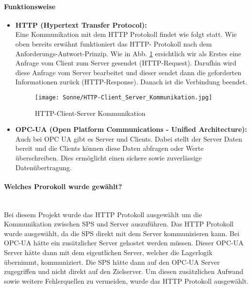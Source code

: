     \paragraph{Funktionsweise}

            \begin{itemize}
                \item \textbf{{HTTP (Hypertext Transfer Protocol):}} \mbox{} \\
                Eine Kommunikation mit dem HTTP Protokoll findet wie folgt statt. Wie oben bereits erwähnt funktioniert das HTTP- Protokoll nach dem Anforderungs-Antwort-Prinzip. Wie in Abb. \ref{HTTP-Client_Server_Kommunikation} ersichtlich wir als Erstes eine Anfrage vom Client zum Server gesendet (HTTP-Request). Darufhin wird diese Anfrage vom Server bearbeitet und dieser sendet dann die geforderten Informationen zurück (HTTP-Response). Danach ist die Verbindung beendet.
                \cite{HTTP-Client_Server_Kommunikation}

                \begin{figure}[h]
                    \centering
                    \texttt{[image: Sonne/HTTP-Client\_Server\_Kommunikation.jpg]}
                    \caption{HTTP-Client-Server Kommunikation 
                    \cite{HTTP-Client_Server_Kommunikation}}
                    \label{HTTP-Client_Server_Kommunikation}
                \end{figure}
            
                \item \textbf{{OPC-UA (Open Platform Communications - Unified Architecture):}} \mbox{} \\
                Auch bei OPC UA gibt es Server und Clients. Dabei stellt der Server Daten bereit und die Clients können diese Daten abfragen oder Werte überschreiben. Dies ermöglicht einen sichere sowie zuverlässige Datenübertragung. 
                \cite{OPC-UA}
            \end{itemize}

            
    \paragraph{Welches Prorokoll wurde gewählt?} \mbox{} \\
    Bei diesem Projekt wurde das HTTP Protokoll ausgewählt um die Kommunikation zwischen SPS und Server auszuführen. Das HTTP Protokoll wurde ausgewählt, da die SPS direkt mit dem Server kommunizieren kann. Bei OPC-UA hätte ein zusätzlicher Server gehostet werden müssen. Dieser OPC-UA Server hätte dann mit dem eigentlichen Server, welcher die Lagerlogik übernimmt, kommuniziert. Die SPS hätte dann auf den OPC-UA Server zugegriffen und nicht direkt auf den Zielserver. Um diesen zusätzlichen Aufwand sowie weitere Fehlerquellen zu vermeiden, wurde das HTTP Protokoll ausgewählt.
        
